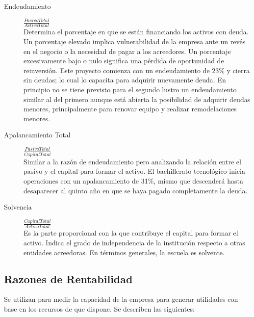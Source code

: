 \begin{description}
    \item[Endeudamiento              ] $ \frac{Pasivo Total}{Activo Total}                       $ \hfill \\
    Determina el porcentaje en que se están financiando los activos con deuda. Un porcentaje elevado implica vulnerabilidad de la empresa ante un revés en el negocio o la necesidad de pagar a los acreedores. Un porcentaje excesivamente bajo o nulo significa una pérdida de oportunidad de reinversión. Este proyecto comienza con un endeudamiento de 23\% y cierra sin deudas; lo cual lo capacita para adquirir nuevamente deuda. En principio no se tiene previsto para el segundo lustro un endeudamiento similar al del primero aunque está abierta la posibilidad de adquirir deudas menores, principalmente para renovar equipo y realizar remodelaciones menores.
    \item[Apalancamiento Total       ] $ \frac{Pasivo Total}{Capital Total}                      $ \hfill \\
    Similar a la razón de endeudamiento pero analizando la relación entre el pasivo y el capital para formar el activo. El bachillerato tecnológico inicia operaciones con un apalancamiento de 31\%, mismo que descenderá hasta desaparecer al quinto año en que se haya pagado completamente la deuda.
    \item[Solvencia                  ] $ \frac{Capital Total}{Activo Total}                      $ \hfill \\
    Es la parte proporcional con la que contribuye el capital para formar el activo. Indica el grado de independencia de la institución respecto a otras entidades acreedoras. En términos generales, la escuela es solvente.
\end{description}

\subsection{Razones de Rentabilidad}

Se utilizan para medir la capacidad de la empresa para generar utilidades con base en los recursos de que dispone. Se describen las siguientes:


